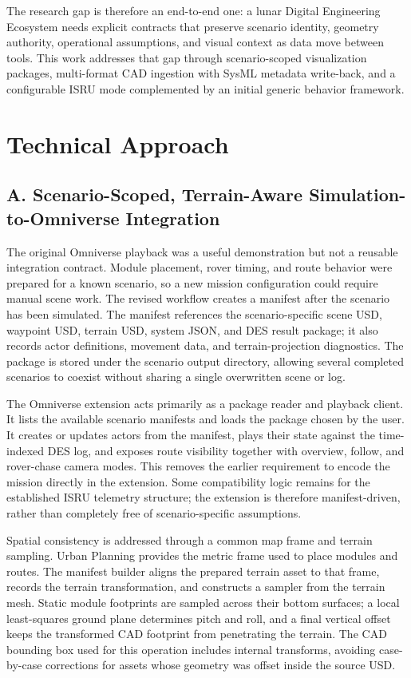 The research gap is therefore an end-to-end one: a lunar Digital Engineering Ecosystem needs explicit contracts that preserve scenario identity, geometry authority, operational assumptions, and visual context as data move between tools. This work addresses that gap through scenario-scoped visualization packages, multi-format CAD ingestion with SysML metadata write-back, and a configurable ISRU mode complemented by an initial generic behavior framework.

\section{Technical Approach}

\subsection{A. Scenario-Scoped, Terrain-Aware Simulation-to-Omniverse Integration}

The original Omniverse playback was a useful demonstration but not a reusable integration contract. Module placement, rover timing, and route behavior were prepared for a known scenario, so a new mission configuration could require manual scene work. The revised workflow creates a manifest after the scenario has been simulated. The manifest references the scenario-specific scene USD, waypoint USD, terrain USD, system JSON, and DES result package; it also records actor definitions, movement data, and terrain-projection diagnostics. The package is stored under the scenario output directory, allowing several completed scenarios to coexist without sharing a single overwritten scene or log.

The Omniverse extension acts primarily as a package reader and playback client. It lists the available scenario manifests and loads the package chosen by the user. It creates or updates actors from the manifest, plays their state against the time-indexed DES log, and exposes route visibility together with overview, follow, and rover-chase camera modes. This removes the earlier requirement to encode the mission directly in the extension. Some compatibility logic remains for the established ISRU telemetry structure; the extension is therefore manifest-driven, rather than completely free of scenario-specific assumptions.

Spatial consistency is addressed through a common map frame and terrain sampling. Urban Planning provides the metric frame used to place modules and routes. The manifest builder aligns the prepared terrain asset to that frame, records the terrain transformation, and constructs a sampler from the terrain mesh. Static module footprints are sampled across their bottom surfaces; a local least-squares ground plane determines pitch and roll, and a final vertical offset keeps the transformed CAD footprint from penetrating the terrain. The CAD bounding box used for this operation includes internal transforms, avoiding case-by-case corrections for assets whose geometry was offset inside the source USD.

